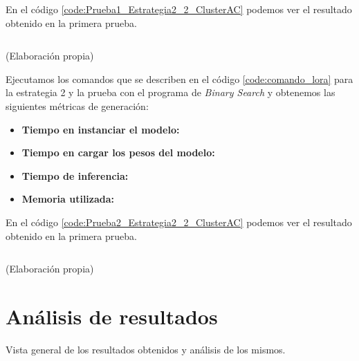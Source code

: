 En el código \ref{code:Prueba1_Estrategia2_2_ClusterAC} podemos ver el resultado obtenido
en la primera prueba.

\begin{mycode}
    \begin{verbatim}

    \end{verbatim}
    \caption[]{ (Elaboración propia)}
    \label{code:Prueba1_Estrategia2_2_ClusterAC}
\end{mycode}

Ejecutamos los comandos que se describen en el código \ref{code:comando_lora} para
la estrategia 2 y la prueba con el programa de \textit{Binary Search} y obtenemos
las siguientes métricas de generación:

\begin{itemize}
    \item \textbf{Tiempo en instanciar el modelo:}
    \item \textbf{Tiempo en cargar los pesos del modelo:}
    \item \textbf{Tiempo de inferencia:}
    \item \textbf{Memoria utilizada:}
\end{itemize}

En el código \ref{code:Prueba2_Estrategia2_2_ClusterAC} podemos ver el resultado obtenido
en la primera prueba.

\begin{mycode}
    \begin{verbatim}

    \end{verbatim}
    \caption[]{ (Elaboración propia)}
    \label{code:Prueba2_Estrategia2_2_ClusterAC}
\end{mycode}

\section{Análisis de resultados}
\label{sec:analisis_resultados}

Vista general de los resultados obtenidos y análisis de los mismos.